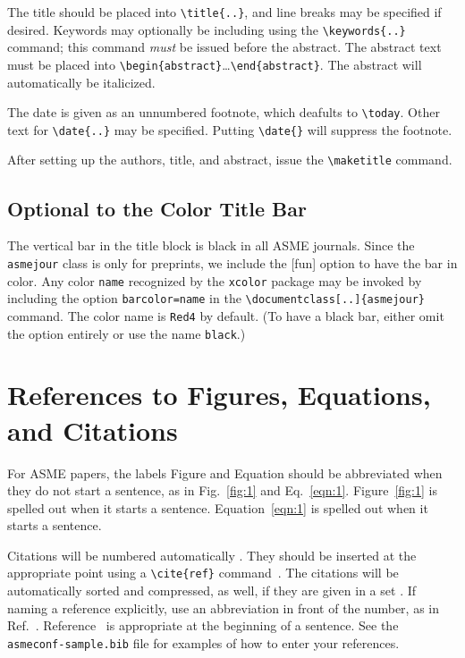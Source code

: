 \documentclass[largesc,upint,varvw,barcolor=Red4,nocopyright,hyphenate,balance,lang-second=french,lang=english]{asmejour}
\begin{document}
The title should be placed into \verb|\title{..}|, and line breaks may be specified if desired. Keywords may optionally be including using the \verb|\keywords{..}| command; this command \textit{must} be issued before the abstract. The abstract text must be placed into \verb|\begin{abstract}|\ldots\verb|\end{abstract}|. The abstract will automatically be italicized. 

The date is given as an unnumbered footnote, which deafults to \verb|\today|. Other text for \verb|\date{..}| may be specified. Putting \verb|\date{}| will suppress the footnote.

After setting up the authors, title, and abstract, issue the \verb|\maketitle| command. 

\subsection{Optional to the Color Title Bar}
The vertical bar in the title block is black in all ASME journals. Since the \texttt{asmejour} class is only for preprints, we include the [fun] option to have the bar in color. Any color \texttt{name} recognized by the \texttt{xcolor} package may be invoked by including the option \texttt{barcolor=name} in the \verb|\documentclass[..]{asmejour}| command. The color name is \texttt{Red4} by default. (To have a black bar, either omit the option entirely or use the name \texttt{black}.)


\section{References to Figures, Equations, and Citations}

For ASME papers, the labels Figure and Equation should be abbreviated when they do not start a sentence, as in Fig.~\ref{fig:1} and Eq.~\eqref{eqn:1}. Figure~\ref{fig:1} is spelled out when it starts a sentence. Equation~\eqref{eqn:1} is spelled out when it starts a sentence. 

Citations will be numbered automatically \cite{DKE1969}. They should be inserted at the appropriate point using a \verb|\cite{ref}| command~\cite{toohey2007,gibson2008}. The citations will be automatically sorted and compressed, as well, if they are given in a set \cite{stevens1999, DKE1969, wions2006, oligaria2011, mollen2014, smith2014, apple2019}. If naming a reference explicitly, use an abbreviation in front of the number, as in Ref.~\cite{smith2014}. Reference~\cite{smith2014} is appropriate at the beginning of a sentence.
See the \texttt{asmeconf-sample.bib} file for examples of how to enter your references.
\end{document}
